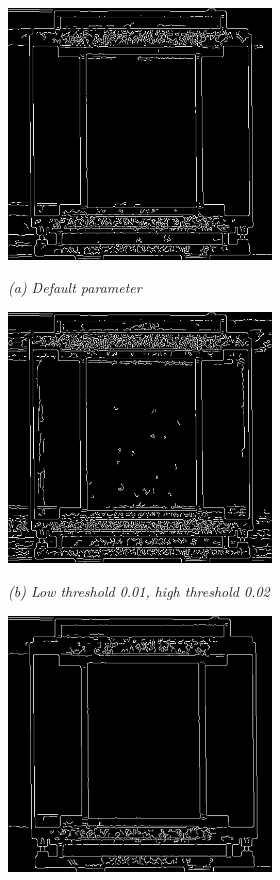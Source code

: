\begin{figure}[htb]
  \begin{minipage}[t]{2.75in}
    \centering
    \centerline{\mbox{\includegraphics[width=2.75in]{data_extraction/images/canny/default/20121017_270.eps}}}
    \centerline{\emph{(a) Default parameter}}
  \end{minipage}\medskip
  \begin{minipage}[t]{2.75in}
    \centering
    \centerline{\mbox{\includegraphics[width=2.75in]{data_extraction/images/canny/0.01_0.02/20121017_270.eps}}}
    \centerline{\emph{(b) Low threshold 0.01, high threshold  0.02}}
  \end{minipage}
  \begin{minipage}[t]{2.75in}
    \centering
    \centerline{\mbox{\includegraphics[width=2.75in]{data_extraction/images/canny/0.02_0.04/20121017_270.eps}}}

\end{minipage}
\end{figure}
